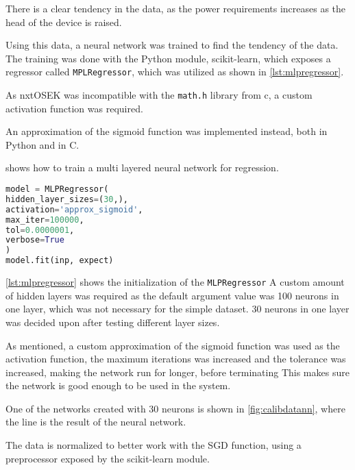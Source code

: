 
There is a clear tendency in the data, as the power requirements increases as the head of the device is raised.

Using this data, a neural network was trained to find the tendency of the data.
The training was done with the Python module, scikit-learn\cite{scikit-learn}, which exposes a regressor called \texttt{MPLRegressor}, which was utilized as shown in \autoref{lst:mlpregressor}.


As nxtOSEK was incompatible with the \texttt{math.h} library from c, a custom activation function was required.

An approximation of the sigmoid function was implemented instead, both in Python and in C.

shows how to train a multi layered neural network for regression.

\begin{lstlisting}[language=python,label={lst:mlpregressor},caption={Training a MLPRegressor with scikit}]
model = MLPRegressor(
hidden_layer_sizes=(30,),
activation='approx_sigmoid',
max_iter=100000,
tol=0.0000001,
verbose=True
)
model.fit(inp, expect)

\end{lstlisting}

\autoref{lst:mlpregressor} shows the initialization of the \texttt{MLPRegressor} 
A custom amount of hidden layers was required as the default argument value was 100 neurons in one layer, which was not necessary for the simple dataset.
30 neurons in one layer was decided upon after testing different layer sizes.

As mentioned, a custom approximation of the sigmoid function was used as the activation function, the maximum iterations was increased and the tolerance was increased, making the network run for longer, before terminating
This makes sure the network is good enough to be used in the system.

One of the networks created with 30 neurons is shown in \autoref{fig:calibdatann}, where the line is the result of the neural network.

The data is normalized to better work with the SGD function, using a preprocessor exposed by the scikit-learn module.

